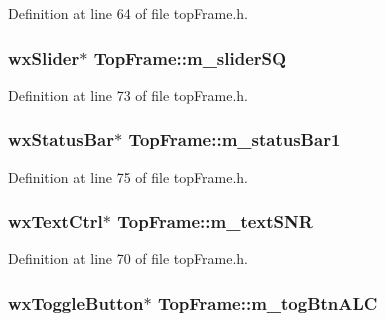 Definition at line 64 of file top\-Frame.\-h.

\hypertarget{class_top_frame_a73c219dba416e316b38bd6f095835aaf}{
\subsubsection[{m\-\_\-slider\-S\-Q}]{\setlength{\rightskip}{0pt plus 5cm}wx\-Slider$\ast$ Top\-Frame\-::m\-\_\-slider\-S\-Q\hspace{0.3cm}{\ttfamily [protected]}}}\label{class_top_frame_a73c219dba416e316b38bd6f095835aaf}


Definition at line 73 of file top\-Frame.\-h.

\hypertarget{class_top_frame_a71fa08a482cbad3b7b3121b25570c25a}{
\subsubsection[{m\-\_\-status\-Bar1}]{\setlength{\rightskip}{0pt plus 5cm}wx\-Status\-Bar$\ast$ Top\-Frame\-::m\-\_\-status\-Bar1\hspace{0.3cm}{\ttfamily [protected]}}}\label{class_top_frame_a71fa08a482cbad3b7b3121b25570c25a}


Definition at line 75 of file top\-Frame.\-h.

\hypertarget{class_top_frame_a0e4812881b601e62d2ebf30579f9d451}{
\subsubsection[{m\-\_\-text\-S\-N\-R}]{\setlength{\rightskip}{0pt plus 5cm}wx\-Text\-Ctrl$\ast$ Top\-Frame\-::m\-\_\-text\-S\-N\-R\hspace{0.3cm}{\ttfamily [protected]}}}\label{class_top_frame_a0e4812881b601e62d2ebf30579f9d451}


Definition at line 70 of file top\-Frame.\-h.

\hypertarget{class_top_frame_ac0cb4ac628d6bd0e25aee632eb9330d2}{
\subsubsection[{m\-\_\-tog\-Btn\-A\-L\-C}]{\setlength{\rightskip}{0pt plus 5cm}wx\-Toggle\-Button$\ast$ Top\-Frame\-::m\-\_\-tog\-Btn\-A\-L\-C}}\label{class_top_frame_ac0cb4ac628d6bd0e25aee632eb9330d2}


